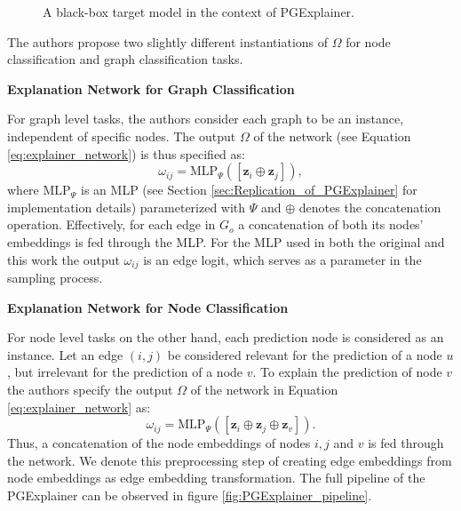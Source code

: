 \begin{figure}
\begin{tikzpicture}
    \end{tikzpicture}
    \caption[Black-box target model in PGExplainer context]{A black-box target model in the context of PGExplainer.}
    \label{fig:blackbox_downstream_model}
\end{figure}

The authors propose two slightly different instantiations of $\Omega$ for node classification and graph classification tasks. \bigskip

\textbf{Explanation Network for Graph Classification}\par
For graph level tasks, the authors consider each graph to be an instance, independent  of specific nodes. The output $\Omega$ of the network (see Equation \ref{eq:explainer_network}) is thus specified as:
\begin{equation}
    \label{eq:mlp_graph_input}
    \omega_{ij} = \text{MLP}_\Psi ([\mathbf{z}_i\oplus\mathbf{z}_j]),
\end{equation}
where $\text{MLP}_\Psi$ is an MLP (see Section \ref{sec:Replication_of_PGExplainer} for implementation details) parameterized with $\Psi$ and $\oplus$ denotes the concatenation operation. Effectively, for each edge in $G_o$ a concatenation of both its nodes' embeddings is fed through the MLP. For the MLP used in both the original and this work the output $\omega_{ij}$ is an edge logit, which serves as a parameter in the sampling process. \bigskip

\textbf{Explanation Network for Node Classification}\par
For node level tasks on the other hand, each prediction node is considered as an instance. Let an edge $(i,j)$ be considered relevant for the prediction of a node $u$, but irrelevant for the prediction of a node $v$. To explain the prediction of node $v$ the authors specify the output $\Omega$ of the network in Equation \ref{eq:explainer_network} as:
\begin{equation}
    \omega_{ij} = \text{MLP}_\Psi ([\mathbf{z}_i\oplus\mathbf{z}_j\oplus\mathbf{z}_v]).
\end{equation}
Thus, a concatenation of the node embeddings of nodes $i, j$ and $v$ is fed through the network. We denote this preprocessing step of creating edge embeddings from node embeddings as edge embedding transformation. The full pipeline of the PGExplainer can be observed in figure \ref{fig:PGExplainer_pipeline}. \bigskip


